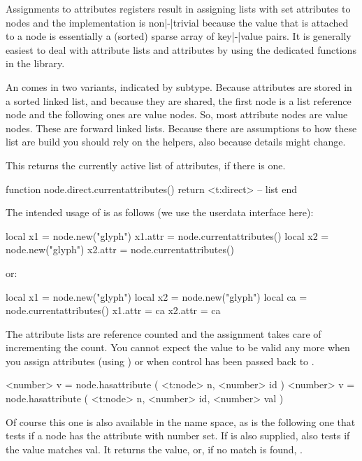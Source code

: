 \stopsubsection

\startsubsection[title={Attributes}]

Assignments to attributes registers result in assigning lists with set attributes
to nodes and the implementation is non|-|trivial because the value that is
attached to a node is essentially a (sorted) sparse array of key|-|value pairs.
It is generally easiest to deal with attribute lists and attributes by using the
dedicated functions in the  library.

An  comes in two variants, indicated by subtype. Because
attributes are stored in a sorted linked list, and because they are shared, the
first node is a list reference node and the following ones are value nodes. So,
most attribute nodes are value nodes. These are forward linked lists. Because
there are assumptions to how these list are build you should rely on the helpers,
also because details might change.

This returns the currently active list of attributes, if there is one.

\starttyping[option=LUA]
function node.direct.currentattributes()
    return <t:direct> -- list
end
\stoptyping

The intended usage of  is as follows (we use the userdata
interface here):

\starttyping[option=LUA]
local x1 = node.new("glyph")
x1.attr = node.currentattributes()
local x2 = node.new("glyph")
x2.attr = node.currentattributes()
\stoptyping

or:

\starttyping[option=LUA]
local x1 = node.new("glyph")
local x2 = node.new("glyph")
local ca = node.currentattributes()
x1.attr = ca
x2.attr = ca
\stoptyping

The attribute lists are reference counted and the assignment takes care of
incrementing the count. You cannot expect the value  to be valid any
more when you assign attributes (using ) or when control
has been passed back to \TEX.

\starttyping[option=LUA]
<number> v = node.hasattribute ( <t:node> n, <number> id )
<number> v = node.hasattribute ( <t:node> n, <number> id, <number> val )
\stoptyping

Of course this one is also available in the  name space, as is
the following one that tests if a node has the attribute with number 
set. If  is also supplied, also tests if the value matches \type
{val}. It returns the value, or, if no match is found, .

